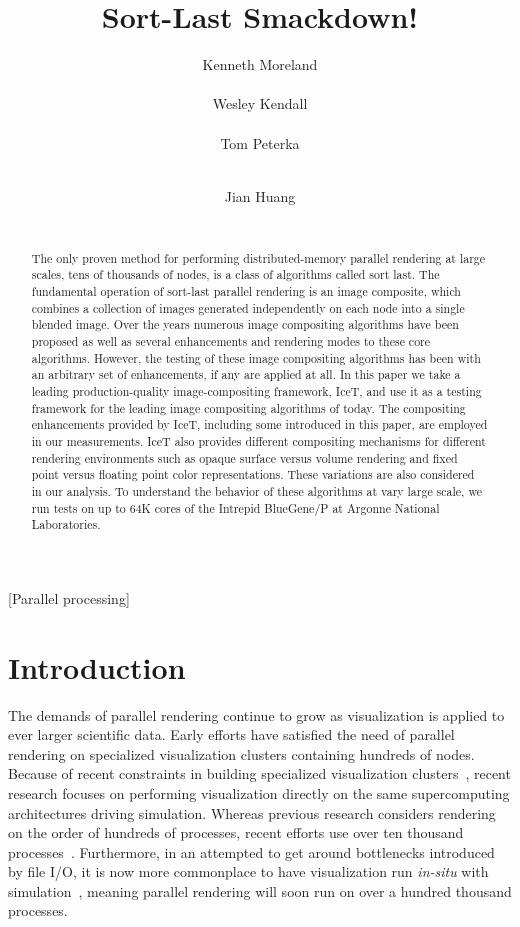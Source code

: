 \documentclass{acm_proc_article-sp}
\title{Sort-Last Smackdown!}
\author{
  \alignauthor Kenneth Moreland \\
  \affaddr{Sandia National Laboratories} \\
  \email{kmorel@sandia.gov}
  \alignauthor Wesley Kendall \\
  \affaddr{University of Tennessee, Knoxville} \\
  \email{kendall@cs.utk.edu}
  \alignauthor Tom Peterka \\
  \affaddr{Argonne National Laboratory} \\
  \email{tpeterka@mcs.anl.gov}
  \and %
  \alignauthor Jian Huang \\
  \affaddr{University of Tennessee, Knoxville} \\
  \email{huangj@eecs.utk.edu}
}
\newcommand*{\lcite}[1]{~\cite{#1}}
\begin{document}
\sloppy

\maketitle

\begin{abstract}
  The only proven method for performing distributed-memory parallel
  rendering at large scales, tens of thousands of nodes, is a class of
  algorithms called sort last.  The fundamental operation of sort-last
  parallel rendering is an image composite, which combines a collection of
  images generated independently on each node into a single blended image.
  Over the years numerous image compositing algorithms have been proposed
  as well as several enhancements and rendering modes to these core
  algorithms.  However, the testing of these image compositing algorithms
  has been with an arbitrary set of enhancements, if any are applied at
  all.  In this paper we take a leading production-quality
  image-compositing framework, IceT, and use it as a testing framework for
  the leading image compositing algorithms of today.  The compositing
  enhancements provided by IceT, including some introduced in this paper,
  are employed in our measurements.  IceT also provides different
  compositing mechanisms for different rendering environments such as
  opaque surface versus volume rendering and fixed point versus floating
  point color representations.  These variations are also considered in our
  analysis.  To understand the behavior of these algorithms at vary large
  scale, we run tests on up to 64K cores of the Intrepid BlueGene/P at
  Argonne National Laboratories.
\end{abstract}


[Parallel processing]


\section{Introduction} 
\label{sec:Introduction}

The demands of parallel rendering continue to grow as visualization is
applied to ever larger scientific data.  Early efforts have satisfied the
need of parallel rendering on specialized visualization clusters containing
hundreds of nodes.  Because of recent constraints in building specialized
visualization clusters\lcite{Childs2007}, recent research focuses on
performing visualization directly on the same supercomputing architectures
driving simulation.  Whereas previous research considers rendering on the
order of hundreds of processes, recent efforts use over ten thousand
processes\lcite{Childs2010}.  Furthermore, in an attempted to get around
bottlenecks introduced by file I/O, it is now more commonplace to have
visualization run \emph{in-situ} with
simulation\lcite{Ma2009:SciDACReview,Ma2009:CG&A,Yu2010,Tu2006}, meaning
parallel rendering will soon run on over a hundred thousand processes.
\end{document}
